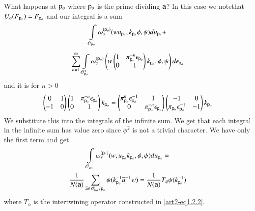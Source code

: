 What happens at $\mathsf{p}_{o}$ where $\mathsf{p}_{o}$ is the prime dividing $\mathsf{a}$? In this case we note\pageoriginale that $U_{o}(F_{\mathsf{p}_{o}})=F_{\mathsf{p}_{o}}$ and our integral is a sum
\begin{gather*}
\int\limits_{\mathscr{O}_{\mathsf{p}_{o}}}\omega_{s}^{(\mathsf{p}_{o})}(wu_{\mathsf{p}_{o}},k_{\mathsf{p}_{o}}\phi,\psi)du_{\mathsf{p}_{o}}+\\[4pt]
\sum\limits^{\infty}_{n=1}\int\limits_{\mathscr{O}^{x}_{\mathsf{p}_{o}}}\omega^{(\mathsf{p}_{o})}_{s}\left(w\left(\begin{matrix} 1 & \pi^{-n}_{\mathsf{p}_{o}}  \epsilon_{\mathsf{p}_{o}}\\
0 & 1
\end{matrix}\right)k_{\mathsf{p}_{o}},\phi,\psi\right)d\epsilon_{\mathsf{p}_{o}}
\end{gather*}
and it is for $n>0$
$$
\left(\begin{matrix}
0 & 1\\
-1 & 0
\end{matrix}\right)\left(
\begin{matrix}
1 & \pi^{-n}_{\mathsf{p}_{o}}\epsilon_{\mathsf{p}_{o}}\\
0 & 1
\end{matrix}
\right)k_{\mathsf{p}_{o}}
=\left(
\begin{matrix}
\pi^{n}_{\mathsf{p}_{o}}\epsilon^{-1}_{\mathsf{p}_{o}} & 1\\
0 & \pi^{-n}_{\mathsf{p}_{o}}\epsilon_{\mathsf{p}_{o}}
\end{matrix}
\right)
\left(
\begin{matrix}
-1 & 0\\
\pi_{\mathsf{p}_{o}}\epsilon^{-1}_{\mathsf{p}_{o}} & -1
\end{matrix}\right)k_{\mathsf{p}_{o}}
$$
We substitute this into the integrals of the infinite sum. We get that each integral in the infinite sum has value zero since $\phi^{2}$ is not a trivial character. We have only the first term and get
\begin{gather*}
\int\limits_{\mathscr{O}_{\mathsf{p}_{o}}}\omega_{s}^{(\mathsf{p}_{o})}(w,u_{\mathsf{p}_{o}}k_{\mathsf{p}_{o}},\phi,\psi)du_{\mathsf{p}_{o}}=\\
\frac{1}{N(\mathsf{a})}\sum\limits_{\overline{u}\in \mathscr{O}_{\mathsf{p}_{o}}/\mathsf{p}_{o}}\psi(k^{-1}_{\mathsf{p}_{o}}\overline{u}^{-1}w)=\frac{1}{N(\mathsf{a})}T_{\phi}\psi(k^{-1}_{\mathsf{p}_{o}})
\end{gather*}
where $T_{\phi}$ is the intertwining operator constructed in \eqref{art2-eq1.2.2}.

